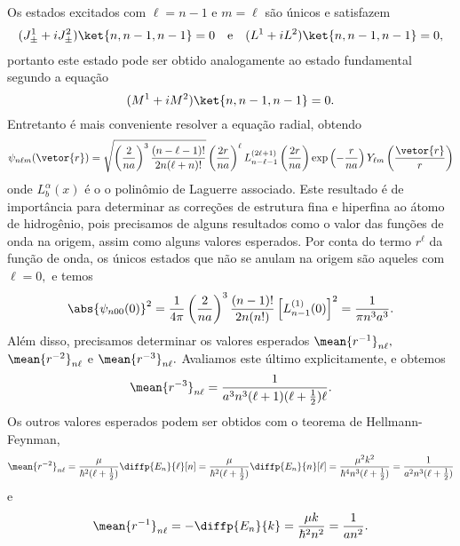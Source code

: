 Os estados excitados com \(\ell = n - 1\) e \(m = \ell\) são únicos e satisfazem
\begin{equation*}
   (J^1_{\pm} + i J^2_{\pm}) \ket{n, n-1, n-1} = 0
   \quad\text{e}\quad
   (L^1 + i L^2) \ket{n, n-1, n-1} = 0,
\end{equation*}
portanto este estado pode ser obtido analogamente ao estado fundamental segundo a equação
\begin{equation*}
   (M^1 + i M^2) \ket{n, n-1, n-1} = 0.
\end{equation*}
Entretanto é mais conveniente resolver a equação radial, obtendo
\begin{equation*}
   \psi_{n\ell m}(\vetor{r}) = \sqrt{\left(\frac{2}{n a}\right)^3\frac{(n - \ell - 1)!}{2n (\ell + n)!}} \left(\frac{2r}{n a}\right)^\ell L_{n - \ell - 1}^{(2\ell + 1)}\left(\frac{2r}{n a}\right) \exp\left(-\frac{r}{na}\right)Y_{\ell m}\left(\frac{\vetor{r}}{r}\right)
\end{equation*}
onde \(L^{\alpha}_b(x)\) é o o polinômio de Laguerre associado. Este resultado é de importância para determinar as correções de estrutura fina e hiperfina ao átomo de hidrogênio, pois precisamos de alguns resultados como o valor das funções de onda na origem, assim como alguns valores esperados. Por conta do termo \(r^\ell\) da função de onda, os únicos estados que não se anulam na origem são aqueles com \(\ell = 0,\) e temos
\begin{equation*}
   \abs{\psi_{n00}(0)}^2 = \frac{1}{4\pi}\left(\frac{2}{n a}\right)^3 \frac{(n - 1)!}{2n(n!)}\left[L_{n - 1}^{(1)}(0)\right]^2 = \frac{1}{\pi n^3 a^3}.
\end{equation*}
Além disso, precisamos determinar os valores esperados \(\mean{r^{-1}}_{n\ell},\) \(\mean{r^{-2}}_{n\ell}\) e \(\mean{r^{-3}}_{n\ell}.\) Avaliamos este último explicitamente, e obtemos
\begin{equation*}
   \mean{r^{-3}}_{n\ell} = \frac{1}{a^3n^3 (\ell + 1) (\ell + \frac12) \ell}.
\end{equation*}
Os outros valores esperados podem ser obtidos com o teorema de Hellmann-Feynman,
\begin{equation*}
   \mean{r^{-2}}_{n\ell} = \frac{\mu}{\hbar^2 (\ell + \frac12)} \diffp{E_n}{\ell}[n] = \frac{\mu}{\hbar^2 (\ell + \frac12)} \diffp{E_n}{n}[\ell] = \frac{\mu^2k^2}{\hbar^4 n^3 (\ell + \frac12)} = \frac{1}{a^2 n^3 (\ell + \frac12)}
\end{equation*}
e
\begin{equation*}
   \mean{r^{-1}}_{n\ell} = -\diffp{E_n}{k} = \frac{\mu k}{\hbar^2 n^2} = \frac{1}{a n^2}.
\end{equation*}

